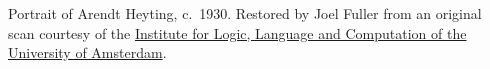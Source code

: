 Portrait of Arendt Heyting, c.~1930. Restored by Joel Fuller from an
original scan courtesy of
the \href{https://www.illc.uva.nl/}{Institute for Logic, Language and
Computation of the University of Amsterdam}.
